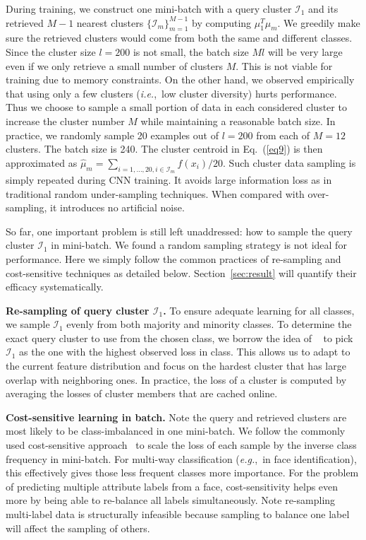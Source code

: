 \documentclass[10pt,journal,compsoc]{IEEEtran}
\newcommand{\eg}{\emph{e.g.}}
\newcommand{\ie}{\emph{i.e.}}
\begin{document}
During training, we construct one mini-batch with a query cluster $\mathcal{I}_1$ and its retrieved $M-1$ nearest clusters $\{\mathcal{I}_m\}_{m=1}^{M-1}$ by computing $\mu_1^T \mu_m$. We greedily make sure the retrieved clusters would come from both the same and different classes. Since the cluster size $l=200$ is not small, the batch size $Ml$ will be very large even if we only retrieve a small number of clusters $M$. This is not viable for training due to memory constraints. On the other hand, we observed empirically that using only a few clusters (\ie,~low cluster diversity) hurts performance. Thus we choose to sample a small portion of data in each considered cluster to increase the cluster number $M$ while maintaining a reasonable batch size. In practice, we randomly sample 20 examples out of $l=200$ from each of $M=12$ clusters. The batch size is 240. The cluster centroid in Eq.~(\ref{eq9}) is then approximated as $\hat{\mu}_m=\sum_{i=1,\dots,20, i \in \mathcal{I}_m}f(x_i)/20$. Such cluster data sampling is simply repeated during CNN training. It avoids large information loss as in traditional random under-sampling techniques. When compared with over-sampling, it introduces no artificial noise.


So far, one important problem is still left unaddressed: how to sample the query cluster $\mathcal{I}_1$ in mini-batch. We found a random sampling strategy is not ideal for performance. Here we simply follow the common practices of re-sampling and cost-sensitive techniques as detailed below. Section~\ref{sec:result} will quantify their efficacy systematically.

\noindent
{\bf Re-sampling of query cluster $\mathcal{I}_1$.} To ensure adequate learning for all classes, we sample $\mathcal{I}_1$ evenly from both majority and minority classes. To determine the exact query cluster to use from the chosen class, we borrow the idea of ~\cite{BuloNK17} to pick $\mathcal{I}_1$ as the one with the highest observed loss in class. This allows us to adapt to the current feature distribution and focus on the hardest cluster that has large overlap with neighboring ones. In practice, the loss of a cluster is computed by averaging the losses of cluster members that are cached online.


\noindent
{\bf Cost-sensitive learning in batch.} Note the query and retrieved clusters are most likely to be class-imbalanced in one mini-batch. We follow the commonly used cost-sensitive approach~\cite{CaesarUF15,MostajabiYS15} to scale the loss of each sample by the inverse class frequency in mini-batch. For multi-way classification (\eg,~in face identification), this effectively gives those less frequent classes more importance. For the problem of predicting multiple attribute labels from a face, cost-sensitivity helps even more by being able to re-balance all labels simultaneously. Note re-sampling multi-label data is structurally infeasible because sampling to balance one label will affect the sampling of others.
\end{document}
